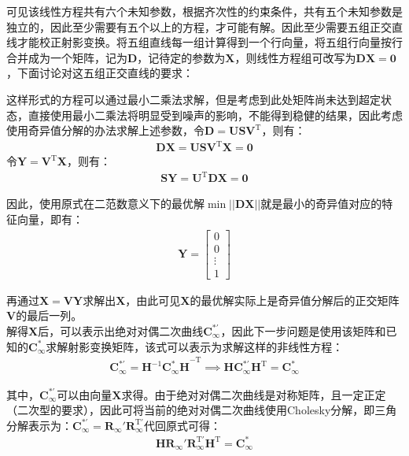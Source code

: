 \documentclass[11pt]{article}
\begin{document}
\par
可见该线性方程共有六个未知参数，根据齐次性的约束条件，共有五个未知参数是独立的，因此至少需要有五个以上的方程，才可能有解。因此至少需要五组正交直线才能校正射影变换。将五组直线每一组计算得到一个行向量，将五组行向量按行合并成为一个矩阵，记为$\mathbf{D}$，记待定的参数为$\mathbf{X}$，则线性方程组可改写为$\mathbf{DX=0}$，下面讨论对这五组正交直线的要求：\par
这样形式的方程可以通过最小二乘法求解，但是考虑到此处矩阵尚未达到超定状态，直接使用最小二乘法将明显受到噪声的影响，不能得到稳健的结果，因此考虑使用奇异值分解的办法求解上述参数，令$\mathbf{D=USV^\mathrm{T}}$，则有：
\begin{align*}
  \mathbf{DX}=\mathbf{USV^\mathrm{T}X}=\mathbf{0}
\end{align*}
令$\mathbf{Y=V^\mathrm{T}X}$，则有：
\begin{align*}
  \mathbf{SY}=\mathbf{U^\mathrm{T}DX}=\mathbf{0}
\end{align*}\par
因此，使用原式在二范数意义下的最优解$\min||\mathbf{DX}||$就是最小的奇异值对应的特征向量，即有：
\begin{align*}
  \mathbf{Y}=\begin{bmatrix}
               0 \\0\\\vdots\\1
             \end{bmatrix}
\end{align*}\par
再通过$\mathbf{X=VY}$求解出$\mathbf{X}$，由此可见$\mathbf{X}$的最优解实际上是奇异值分解后的正交矩阵$\mathbf{V}$的最后一列。\\
解得$\mathbf{X}$后，可以表示出绝对对偶二次曲线$\mathbf{C_\infty^{*'}}$，因此下一步问题是使用该矩阵和已知的$\mathbf{C_\infty^{*}}$求解射影变换矩阵，该式可以表示为求解这样的非线性方程：
\begin{align}
  \mathbf{C_\infty^{*'}}=\mathbf{H}^{-1}\mathbf{C_\infty^*H}^{-\textrm{T}}  \implies\mathbf{H}\mathbf{C_\infty^{*'}}\mathbf{H}^\mathrm{T}=\mathbf{C_\infty^*}
\end{align}\par
其中，$\mathbf{C_\infty^{*'}}$可以由向量$\mathbf{X}$求得。由于绝对对偶二次曲线是对称矩阵，且一定正定（二次型的要求），因此可将当前的绝对对偶二次曲线使用Cholesky分解，即三角分解表示为：$\mathbf{C_\infty^{*'}}=\mathbf{R_\infty' R_\infty^\mathrm{T'}}$代回原式可得：
\begin{align}
  \mathbf{HR_\infty' R_\infty^\mathrm{T'} H^\mathrm{T}=C_\infty^*}
  \label{eq:C_infty_SVD}
\end{align}\par
\end{document}
